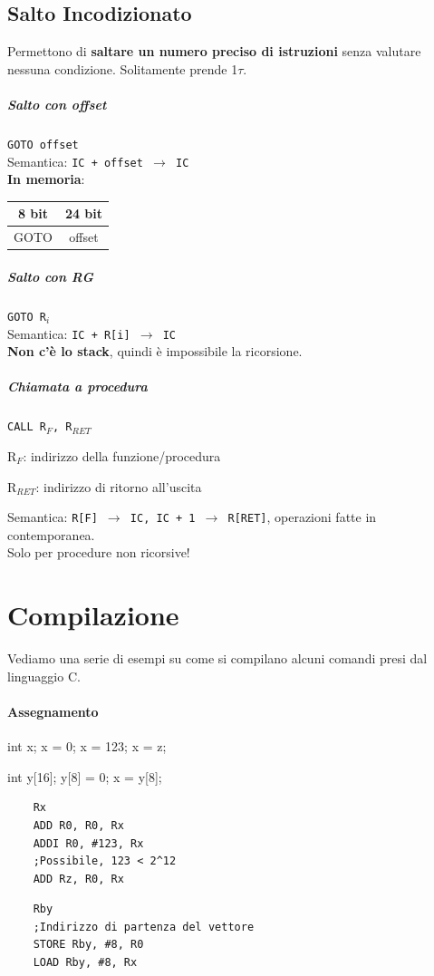 \documentclass[10pt]{report}
\begin{document}
\subsection{Salto Incodizionato}
Permettono di \textbf{saltare un numero preciso di istruzioni} senza valutare nessuna condizione. Solitamente prende 1$\tau$.
\subparagraph{Salto con offset} \texttt{GOTO offset}\\
Semantica: \texttt{IC + offset $\rightarrow$ IC}\\
\textbf{In memoria}:  
\begin{tabular}{| c | c |}
\hline
8 bit & 24 bit \\
\hline
GOTO & offset \\
\hline
\end{tabular}
\subparagraph{Salto con RG} \texttt{GOTO R$_i$}\\
Semantica: \texttt{IC + R[i] $\rightarrow$ IC}\\
\textbf{Non c'è lo stack}, quindi è impossibile la ricorsione.
\subparagraph{Chiamata a procedura} \texttt{CALL R$_F$, R$_{RET}$}
\begin{list}{}{}
	\item R$_F$: indirizzo della funzione/procedura
	\item R$_{RET}$: indirizzo di ritorno all'uscita
\end{list}
Semantica: \texttt{R[F] $\rightarrow$ IC, IC + 1 $\rightarrow$ R[RET]}, operazioni fatte in contemporanea.\\
Solo per procedure non ricorsive!
\pagebreak
\section{Compilazione}
Vediamo una serie di esempi su come si compilano alcuni comandi presi dal linguaggio C.
\paragraph{Assegnamento}
\begin{multicols}{2}
\begin{center}
	\begin{C}
	int x;
	x = 0;
	x = 123;
	x = z;
	\end{C}
	\begin{C}
	int y[16];
	y[8] = 0;
	x = y[8];
	\end{C}
\end{center}
\columnbreak
\begin{center}
	\begin{lstlisting}
	Rx
	ADD R0, R0, Rx
	ADDI R0, #123, Rx
	;Possibile, 123 < 2^12
	ADD Rz, R0, Rx
	\end{lstlisting}
	\begin{lstlisting}
	Rby
	;Indirizzo di partenza del vettore
	STORE Rby, #8, R0
	LOAD Rby, #8, Rx
	\end{lstlisting}
\end{center}
\end{multicols}
\end{document}
